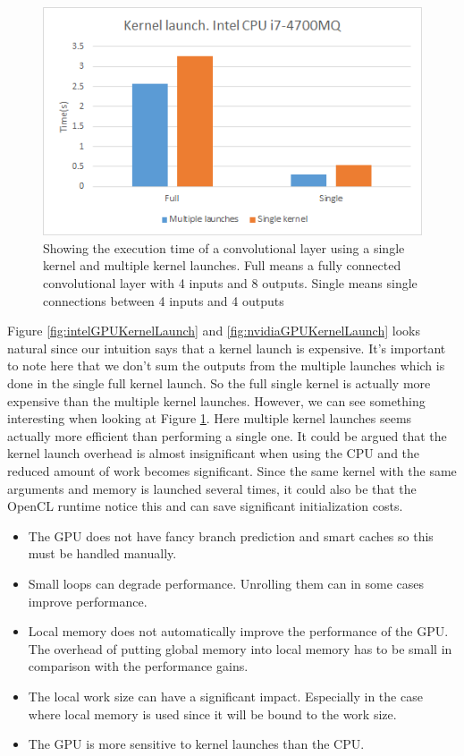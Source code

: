 \documentclass[a4paper,10pt]{article}
\theoremstyle{definition}
\begin{document}
\begin{figure}[H]
	\centering
	\includegraphics{IntelCPUKernelLaunch}
	\caption{Showing the execution time of a convolutional layer using a single kernel and multiple kernel launches. Full means a fully connected convolutional layer with 4 inputs and 8 outputs. Single means single connections between 4 inputs and 4 outputs}
	\label{fig:cpuKernelLaunch}
\end{figure}

Figure \ref{fig:intelGPUKernelLaunch} and \ref{fig:nvidiaGPUKernelLaunch} looks natural since our intuition says that a kernel launch is expensive. It's important to note here that we don't sum the outputs from the multiple launches which is done in the single full kernel launch. So the full single kernel is actually more expensive than the multiple kernel launches. However, we can see something interesting when looking at Figure \ref{fig:cpuKernelLaunch}. Here multiple kernel launches seems actually more efficient than performing a single one. It could be argued that the kernel launch overhead is almost insignificant when using the CPU and the reduced amount of work becomes significant. Since the same kernel with the same arguments and memory is launched several times, it could also be that the OpenCL runtime notice this and can save significant initialization costs.

  \begin{itemize}
  	\item  The GPU does not have fancy branch prediction and smart caches so this must be handled manually.
  	\item Small loops can degrade performance. Unrolling them can in some cases improve performance.
	\item Local memory does not automatically improve the performance of the GPU. The overhead of putting global memory into local memory has to be small in comparison with the performance gains.
	\item The local work size can have a significant impact. Especially in the case where local memory is used since it will be bound to the work size.
	\item The GPU is more sensitive to kernel launches than the CPU.
  \end{itemize}
  
\end{document}
